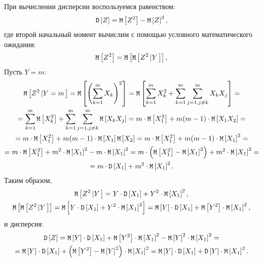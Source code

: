 При вычислении дисперсии воспользуемся равенством:
\begin{equation}
    \mathtt{D} \left [ Z \right ]
    = \mathtt{M} \left [ Z^2 \right ] - \mathtt{M} \left [ Z \right ]^2 ,
\end{equation}
где второй начальный момент вычислим с помощью условного математического ожидания:
\begin{equation}
    \mathtt{M} \left [ Z^2 \right ]
    = \mathtt{M} \left [ \mathtt{M} \left [ Z^2 \left | Y \right . \right ] \right ] ,
\end{equation}
Пусть $Y = m$:
\begin{multline}
    \mathtt{M} \left [ Z^2 \left | Y=m \right . \right ]
    = \mathtt{M} \left [ \left ( \sum_{k=1}^m X_k \right )^2 \right ]
    = \mathtt{M} \left [ \sum_{k=1}^m X_k^2 + \sum_{k=1}^m \sum_{j=1, j \neq k}^m X_k X_j \right ] = \\
    = \sum_{k=1}^m \mathtt{M} \left [ X_k^2 \right ] + \sum_{k=1}^m \sum_{j=1, j \neq k}^m \mathtt{M} \left [ X_k X_j \right ]
    = m \cdot \mathtt{M} \left [ X_1^2 \right ] + m(m-1) \cdot \mathtt{M} \left [ X_1 X_2 \right ] = \\
    = m \cdot \mathtt{M} \left [ X_1^2 \right ] + m(m-1) \cdot \mathtt{M} \left [ X_1 \right ] \mathtt{M} \left [ X_2 \right ]
    = m \cdot \mathtt{M} \left [ X_1^2 \right ] + m(m-1) \cdot \mathtt{M} \left [ X_1 \right ]^2 = \\
    = m \cdot \mathtt{M} \left [ X_1^2 \right ] + m^2 \cdot \mathtt{M} \left [ X_1 \right ]^2 - m \cdot \mathtt{M} \left [ X_1 \right ]^2
    = m \cdot \left ( \mathtt{M} \left [ X_1^2 \right ] - \mathtt{M} \left [ X_1 \right ]^2 \right ) + m^2 \cdot \mathtt{M} \left [ X_1 \right ]^2 = \\
    = m \cdot \mathtt{D} \left [ X_1 \right ] + m^2 \cdot \mathtt{M} \left [ X_1 \right ]^2 .
\end{multline}
Таким образом,
\begin{gather}
    \mathtt{M} \left [ Z^2 \left | Y \right . \right ]
    = Y \cdot \mathtt{D} \left [ X_1 \right ] + Y^2 \cdot \mathtt{M} \left [ X_1 \right ]^2 , \\
    \mathtt{M} \left [ \mathtt{M} \left [ Z^2 \left | Y \right . \right ] \right ]
    = \mathtt{M} \left [ Y \cdot \mathtt{D} \left [ X_1 \right ] + Y^2 \cdot \mathtt{M} \left [ X_1 \right ]^2 \right ]
    = \mathtt{M} \left [ Y \right ] \cdot \mathtt{D} \left [ X_1 \right ] + \mathtt{M} \left [ Y^2 \right ] \cdot \mathtt{M} \left [ X_1 \right ]^2,
\end{gather}
и дисперсия:
\begin{multline}
    \mathtt{D} \left [ Z \right ]
    = \mathtt{M} \left [ Y \right ] \cdot \mathtt{D} \left [ X_1 \right ] + \mathtt{M} \left [ Y^2 \right ] \cdot \mathtt{M} \left [ X_1 \right ]^2 - \mathtt{M} \left [ Y \right ]^2 \cdot \mathtt{M} \left [ X_1 \right ]^2 = \\
    = \mathtt{M} \left [ Y \right ] \cdot \mathtt{D} \left [ X_1 \right ] + \left ( \mathtt{M} \left [ Y^2 \right ] - \mathtt{M} \left [ Y \right ]^2 \right ) \cdot \mathtt{M} \left [ X_1 \right ]^2
    = \mathtt{M} \left [ Y \right ] \cdot \mathtt{D} \left [ X_1 \right ] + \mathtt{D} \left [ Y \right ] \cdot \mathtt{M} \left [ X_1 \right ]^2.
\end{multline}
